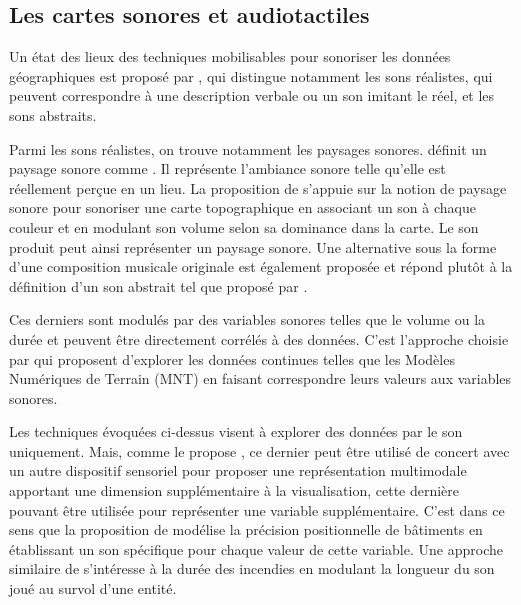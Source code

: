 
\label{ea_cartetactile}

\subsection{Les cartes sonores et audiotactiles}

\label{ea_cartessonores}

Un état des lieux des techniques mobilisables pour sonoriser les données géographiques est proposé par \cite{Krygier1994}, qui distingue notamment les sons réalistes, qui peuvent correspondre à une description verbale ou un son imitant le réel, et les sons abstraits.

\newpar{}


Parmi les sons réalistes, on trouve notamment les paysages sonores. \cite{Porteous1985} définit un paysage sonore comme . Il représente l'ambiance sonore telle qu'elle est réellement perçue en un lieu. La proposition de \cite{Josselin2016} s'appuie sur la notion de paysage sonore pour sonoriser une carte topographique en associant un son à chaque couleur et en modulant son volume selon sa dominance dans la carte. Le son produit peut ainsi représenter un paysage sonore. Une alternative sous la forme d'une composition musicale originale est également proposée et répond plutôt à la définition d'un son abstrait tel que proposé par \cite{Krygier1994}.


Ces derniers sont  modulés par des variables sonores telles que le volume ou la durée et peuvent être directement corrélés à des données. C'est l'approche choisie par \cite{Schito2018} qui proposent d'explorer les données continues telles que les Modèles Numériques de Terrain (MNT) en faisant correspondre leurs valeurs aux variables sonores.

\newpar{}


Les techniques évoquées ci-dessus visent à explorer des données par le son uniquement. Mais, comme le propose \cite{Krygier1994}, ce dernier peut être utilisé de concert avec un autre dispositif sensoriel pour proposer une représentation multimodale apportant une dimension supplémentaire à la visualisation, cette dernière pouvant être utilisée pour représenter une variable supplémentaire. C'est dans ce sens que la proposition de \cite{Bearman2010} modélise la précision positionnelle de bâtiments en établissant un son spécifique pour chaque valeur de cette variable. Une approche similaire de \cite{Foteinou2022} s'intéresse à la durée des incendies en modulant la longueur du son joué au survol d'une entité.

